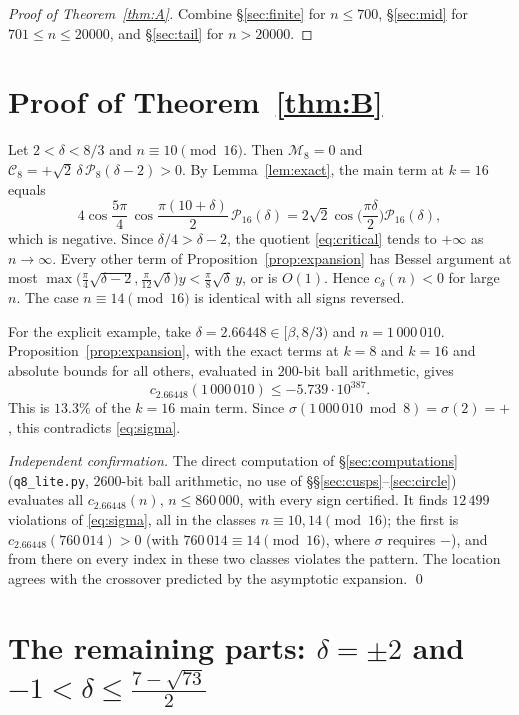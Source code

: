 \documentclass[11pt]{amsart}
\theoremstyle{remark}
\theoremstyle{definition}
\newcommand{\cP}{\mathcal P}
\begin{document}
\begin{proof}[Proof of Theorem~\ref{thm:A}]
Combine \S\ref{sec:finite} for $n\le700$, \S\ref{sec:mid} for $701\le n\le20000$, and \S\ref{sec:tail} for $n>20000$.
\end{proof}

\section{Proof of Theorem~\ref{thm:B}}\label{sec:B}

Let $2<\delta<8/3$ and $n\equiv10\pmod{16}$. Then $\mathcal M_8=0$ and $\mathcal C_8=+\sqrt2\,\delta\,\cP_8(\delta-2)>0$. By Lemma~\ref{lem:exact}, the main term at $k=16$ equals
\[
4\cos\frac{5\pi}4\,\cos\frac{\pi(10+\delta)}2\,\cP_{16}(\delta)=2\sqrt2\cos\Big(\frac{\pi\delta}2\Big)\cP_{16}(\delta),
\]
which is negative. Since $\delta/4>\delta-2$, the quotient \eqref{eq:critical} tends to $+\infty$ as $n\to\infty$. Every other term of Proposition~\ref{prop:expansion} has Bessel argument at most $\max\big(\frac\pi4\sqrt{\delta-2},\frac\pi{12}\sqrt\delta\big)y<\frac\pi8\sqrt\delta\,y$, or is $O(1)$. Hence $c_\delta(n)<0$ for large $n$. The case $n\equiv14\pmod{16}$ is identical with all signs reversed.

For the explicit example, take $\delta=2.66448\in[\beta,8/3)$ and $n=1\,000\,010$. Proposition~\ref{prop:expansion}, with the exact terms at $k=8$ and $k=16$ and absolute bounds for all others, evaluated in $200$-bit ball arithmetic, gives
\[
c_{2.66448}(1\,000\,010)\le-5.739\cdot10^{387}.
\]
This is $13.3\%$ of the $k=16$ main term. Since $\sigma(1\,000\,010\bmod8)=\sigma(2)=+$, this contradicts \eqref{eq:sigma}.

\emph{Independent confirmation.} The direct computation of \S\ref{sec:computations} (\texttt{q8\_lite.py}, $2600$-bit ball arithmetic, no use of \S\S\ref{sec:cusps}--\ref{sec:circle}) evaluates all $c_{2.66448}(n)$, $n\le860\,000$, with every sign certified. It finds $12\,499$ violations of \eqref{eq:sigma}, all in the classes $n\equiv10,14\pmod{16}$; the first is $c_{2.66448}(760\,014)>0$ (with $760\,014\equiv14\pmod{16}$, where $\sigma$ requires $-$), and from there on every index in these two classes violates the pattern. The location agrees with the crossover predicted by the asymptotic expansion.
\qed

\section{The remaining parts: \texorpdfstring{$\delta=\pm2$}{delta = +-2} and \texorpdfstring{$-1<\delta\le\frac{7-\sqrt{73}}2$}{-1 < delta <= (7-sqrt73)/2}}\label{sec:rest}
\end{document}
